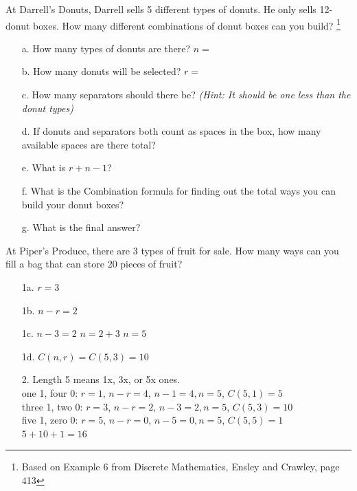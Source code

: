 {    
    \begin{questionNOGRADE}{\thequestion}
        At Darrell's Donuts, Darrell sells 5 different types of donuts.
        He only sells 12-donut boxes. How many different combinations
        of donut boxes can you build?
        \footnote{Based on Example 6 from Discrete Mathematics, Ensley and Crawley, page 413}

        \begin{enumerate}
            \item[a.]   How many types of donuts are there? $n =$
            \item[b.]   How many donuts will be selected? $r = $
            \item[c.]   How many separators should there be?
                        \textit{(Hint: It should be one less than the donut types)}
            \item[d.]   If donuts and separators both count as spaces in the box,
                        how many available spaces are there total?
            \item[e.]   What is $r + n - 1$?
            \item[f.]   What is the Combination formula for finding out the total ways you can build your donut boxes?
            \item[g.]   What is the final answer?
        \end{enumerate}
    \end{questionNOGRADE}

    \hrulefill

    \begin{questionNOGRADE}{\thequestion}
        At Piper's Produce, there are 3 types of fruit for sale.
        How many ways can you fill a bag that can store 20 pieces of fruit?
    \end{questionNOGRADE}
}{
    \begin{itemize}
        \item[1a.]	$r = 3$
        \item[1b.]	$n-r = 2$
        \item[1c.]	$n-3 = 2$ \tab $n = 2 + 3$ \tab $n = 5$
        \item[1d.]	$C(n,r) = C(5,3) = 10$
        
        \item[2.]	Length 5 means 1x, 3x, or 5x ones.
					\\ one 1, four 0:	$r = 1$, $n-r = 4$, $n-1=4, n=5$, $C(5,1) = 5$
					\\ three 1, two 0:	$r = 3$, $n-r = 2$, $n-3=2, n=5$, $C(5,3) = 10$
					\\ five 1, zero 0:	$r = 5$, $n-r = 0$, $n-5=0, n=5$, $C(5,5) = 1$
					\\ $5 + 10 + 1 = 16$
		

\end{itemize}}

